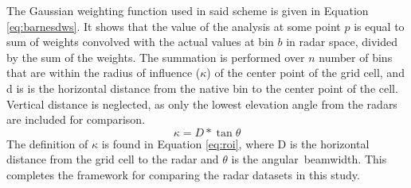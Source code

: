 The Gaussian weighting function used in said scheme is given in Equation \ref{eq:barnesdws}. It shows that the value of the analysis at some point $p$ is
equal to sum of weights convolved with the actual values at bin $b$ in radar space, divided by the sum of the weights. The summation is performed over $n$
number of bins that are within the radius of influence ($\kappa$) of the center point of the grid cell, and d is is the horizontal distance from the native
bin to the center point of the cell. Vertical distance is neglected, as only the lowest elevation angle from the radars are included for comparison.
\begin{equation}\label{eq:roi}
\kappa = D * \tan{\theta}
\end{equation}
The definition of $\kappa$ is found in Equation \ref{eq:roi}, where D is the horizontal distance from the grid cell to the radar and $\theta$ is the angular\
beamwidth. This completes the framework for comparing the radar datasets in this study.
